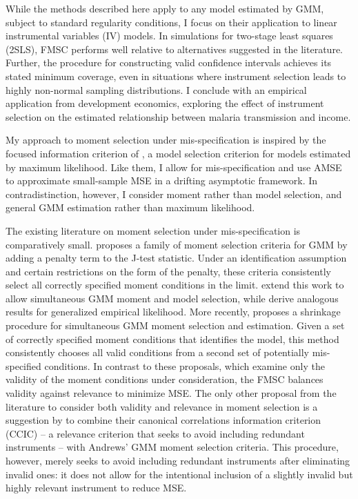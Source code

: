 \documentclass[12pt]{article}
\theoremstyle{definition}
\begin{document}
While the methods described here apply to any model estimated by GMM, subject to standard regularity conditions, I focus on their application to linear instrumental variables (IV) models. 
In simulations for two-stage least squares (2SLS), FMSC performs well relative to alternatives suggested in the literature. 
Further, the procedure for constructing valid confidence intervals achieves its stated minimum coverage, even in situations where instrument selection leads to highly non-normal sampling distributions. 
I conclude with an empirical application from development economics, exploring the effect of instrument selection on the estimated relationship between malaria transmission and income. 

My approach to moment selection under mis-specification is inspired by the focused information criterion of \citet{ClaeskensHjort2003}, a model selection criterion for models estimated by maximum likelihood. 
Like them, I allow for mis-specification and use AMSE to approximate small-sample MSE in a drifting asymptotic framework. 
In contradistinction, however, I consider moment rather than model selection, and general GMM estimation rather than maximum likelihood.
 
The existing literature on moment selection under mis-specification is comparatively small. 
\cite{Andrews1999} proposes a family of moment selection criteria for GMM by adding a penalty term to the J-test statistic. 
Under an identification assumption and certain restrictions on the form of the penalty, these criteria consistently select all correctly specified moment conditions in the limit. 
\cite{AndrewsLu} extend this work to allow simultaneous GMM moment and model selection, while \cite{HongPrestonShum} derive analogous results for generalized empirical likelihood. 
More recently, \cite{Liao} proposes a shrinkage procedure for simultaneous GMM moment selection and estimation. 
Given a set of correctly specified moment conditions that identifies the model, this method consistently chooses all valid conditions from a second set of potentially mis-specified conditions.
In contrast to these proposals, which examine only the validity of the moment conditions under consideration, the FMSC balances validity against relevance to minimize MSE. 
The only other proposal from the literature to consider both validity and relevance in moment selection is a suggestion by \cite{HallPeixe2003} to combine their canonical correlations information criterion (CCIC) -- a relevance criterion that seeks to avoid including redundant instruments -- with Andrews' GMM moment selection criteria. 
This procedure, however, merely seeks to avoid including redundant instruments after eliminating invalid ones: it does not allow for the intentional inclusion of a slightly invalid but highly relevant instrument to reduce MSE. 
\end{document}
